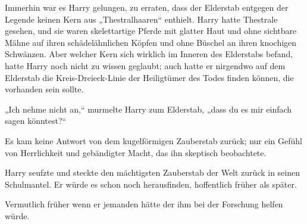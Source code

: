 Immerhin war es Harry gelungen, zu erraten, dass der Elderstab entgegen der Legende keinen Kern aus „Thestralhaaren“ enthielt. Harry hatte Thestrale gesehen, und sie waren skelettartige Pferde mit glatter Haut und ohne sichtbare Mähne auf ihren schädelähnlichen Köpfen und ohne Büschel an ihren knochigen Schwänzen. Aber welcher Kern sich wirklich im Inneren des Elderstabs befand, hatte Harry noch nicht zu wissen geglaubt; auch hatte er nirgendwo auf dem Elderstab die Kreis-Dreieck-Linie der Heiligtümer des Todes finden können, die vorhanden sein sollte.

„Ich nehme nicht an,“ murmelte Harry zum Elderstab, „dass du es mir einfach sagen könntest?“

Es kam keine Antwort von dem kugelförmigen Zauberstab zurück; nur ein Gefühl von Herrlichkeit und gebändigter Macht, das ihn skeptisch beobachtete.

Harry seufzte und steckte den mächtigsten Zauberstab der Welt zurück in seinen Schulmantel. Er würde es schon noch herausfinden, hoffentlich früher als später.

Vermutlich früher wenn er jemanden hätte der ihm bei der Forschung helfen würde.

